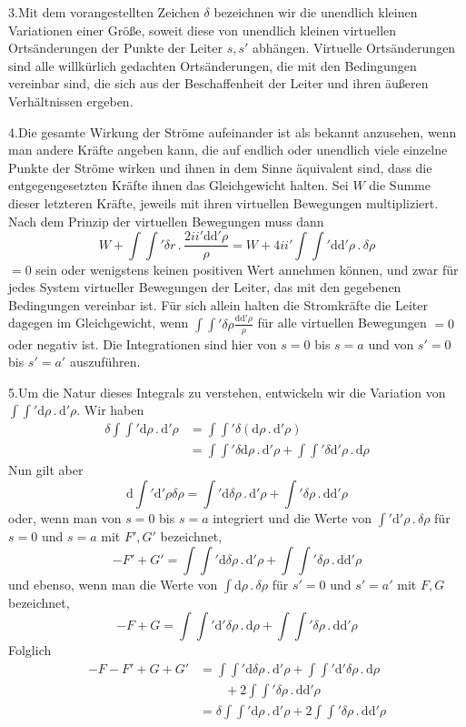3.\quad Mit dem vorangestellten Zeichen $\delta$ bezeichnen wir die unendlich kleinen Variationen einer Größe, soweit diese von unendlich kleinen virtuellen Ortsänderungen der Punkte der Leiter $s,s'$ abhängen. Virtuelle Ortsänderungen sind alle willkürlich gedachten Ortsänderungen, die mit den Bedingungen vereinbar sind, die sich aus der Beschaffenheit der Leiter und ihren äußeren Verhältnissen ergeben.

4.\quad Die gesamte Wirkung der Ströme aufeinander ist als bekannt anzusehen, wenn man andere Kräfte angeben kann, die auf endlich oder unendlich viele einzelne Punkte der Ströme wirken und ihnen in dem Sinne äquivalent sind, dass die entgegengesetzten Kräfte ihnen das Gleichgewicht halten. Sei $W$ die Summe dieser letzteren Kräfte, jeweils mit ihren virtuellen Bewegungen multipliziert. Nach dem Prinzip der virtuellen Bewegungen muss dann
\[
W+\int\int'\delta r\,.\,\frac{2ii'\mathrm d\mathrm d'\rho}{\rho}=W+4ii'\int\int'\mathrm d\mathrm d'\rho\,.\,\delta\rho
\]
$=0$ sein oder wenigstens keinen positiven Wert annehmen können, und zwar für jedes System virtueller Bewegungen der Leiter, das mit den gegebenen Bedingungen vereinbar ist. Für sich allein halten die Stromkräfte die Leiter dagegen im Gleichgewicht, wenn $\int\int'\delta\rho\frac{\mathrm d\mathrm d'\rho}{\rho}$ für alle virtuellen Bewegungen $=0$ oder negativ ist. Die Integrationen sind hier von $s=0$ bis $s=a$ und von $s'=0$ bis $s'=a'$ auszuführen.

5.\quad Um die Natur dieses Integrals zu verstehen, entwickeln wir die Variation von $\int\int'\mathrm d\rho\,.\,\mathrm d'\rho$. Wir haben
\[
\begin{aligned}
\delta\int\int'\mathrm d\rho\,.\,\mathrm d'\rho&=\int\int'\delta(\mathrm d\rho\,.\,\mathrm d'\rho)\\
&=\int\int'\delta\mathrm d\rho\,.\,\mathrm d'\rho+\int\int'\delta\mathrm d'\rho\,.\,\mathrm d\rho
\end{aligned}
\]
Nun gilt aber
\[
\mathrm d\int'\mathrm d'\rho\delta\rho=\int'\mathrm d\delta\rho\,.\,\mathrm d'\rho+\int'\delta\rho\,.\,\mathrm d\mathrm d'\rho
\]
oder, wenn man von $s=0$ bis $s=a$ integriert und die Werte von $\int'\mathrm d'\rho\,.\,\delta\rho$ für $s=0$ und $s=a$ mit $F',G'$ bezeichnet,
\[
-F'+G'=\int\int'\mathrm d\delta\rho\,.\,\mathrm d'\rho+\int\int'\delta\rho\,.\,\mathrm d\mathrm d'\rho
\]
und ebenso, wenn man die Werte von $\int\mathrm d\rho\,.\,\delta\rho$ für $s'=0$ und $s'=a'$ mit $F,G$ bezeichnet,
\[
-F+G=\int\int'\mathrm d'\delta\rho\,.\,\mathrm d\rho+\int\int'\delta\rho\,.\,\mathrm d\mathrm d'\rho
\]
Folglich
\[
\begin{aligned}
-F-F'+G+G'&=\int\int'\mathrm d\delta\rho\,.\,\mathrm d'\rho+\int\int'\mathrm d'\delta\rho\,.\,\mathrm d\rho\\
&\qquad+2\int\int'\delta\rho\,.\,\mathrm d\mathrm d'\rho\\
&=\delta\int\int'\mathrm d\rho\,.\,\mathrm d'\rho+2\int\int'\delta\rho\,.\,\mathrm d\mathrm d'\rho
\end{aligned}
\]


